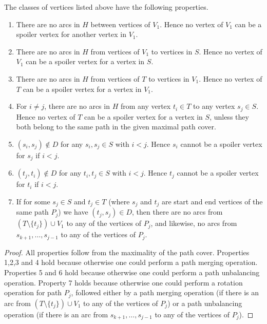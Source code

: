 \documentclass{toc}
\theoremstyle{plain}
\begin{document}
\begin{lemma}
	\label{lem:properties}
The classes of vertices listed above have the following properties. %
	\begin{enumerate}
		\item There are no arcs in $H$ between vertices of $V_1$. Hence no vertex of $V_1$ can be a spoiler vertex for another vertex in $V_1$.
		\item There are no arcs in $H$ from vertices of $V_1$ to vertices in $S$. Hence no vertex of $V_1$ can be a spoiler vertex for a vertex in $S$.
		\item There are no arcs in $H$ from vertices of $T$ to vertices in $V_1$. Hence no vertex of $T$ can be a spoiler vertex for a vertex in $V_1$.
		\item For $i \not= j$, there are no arcs in $H$ from any vertex $t_i\in T$ to any vertex $s_j \in S$. Hence no vertex of $T$ can be a spoiler vertex for a vertex in $S$, unless they both belong to the same path in the given maximal path cover.
		\item $(s_i,s_j) \not\in D$ for any $s_i,s_j \in S$ with $i < j$.  Hence $s_i$ cannot be a spoiler vertex for $s_j$ if $i < j$.
		\item $(t_j,t_i) \not\in D$ for any $t_i,t_j \in S$ with $i < j$.  Hence $t_j$ cannot be a spoiler vertex for $t_i$ if $i < j$.
		\item If for some $s_j \in S$ and $t_j \in T$ (where $s_j$ and $t_j$ are start and end vertices of the same path $P_j$) 
%
we have  %
$(t_j,s_j)\in D$, then there are no arcs from $(T \setminus \{t_j\}) \cup V_1$ to any of the vertices of $P_j$, and likewise, no arcs from $s_{k+1}, \ldots, s_{j-1}$ to any of the vertices of $P_j$.
	\end{enumerate}
\end{lemma}

\begin{proof}
	All properties follow from the maximality of the path cover. Properties 1,2,3 and 4 hold because otherwise one could perform a path merging operation. Properties 5 and 6 hold because otherwise one could perform a path unbalancing operation. Property 7 holds because otherwise one could perform a rotation operation for path $P_j$, followed either by a path merging operation (if there is an arc from $(T \setminus \{t_j\}) \cup V_1$ to any of the vertices of $P_j$) or a path unbalancing operation (if there is an arc from $s_{k+1}, \ldots, s_{j-1}$ to any of the vertices of $P_j$).
\end{proof}
\end{document}

